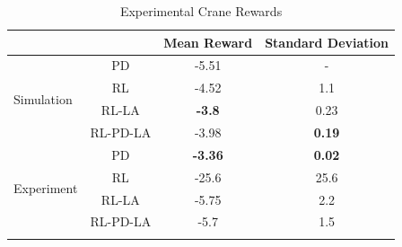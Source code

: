 \begin{table}[tb]
\begin{center}
  \setlength{\tabcolsep}{6pt}
  \caption{Experimental Crane Rewards}
  \begin{tabular}{ l c c c }
    \hline
              & & \textbf{Mean Reward} & \textbf{Standard Deviation}\\
   \hline
   \multirow{4}{*}{Simulation} & PD & -5.51 & -\\
              & RL & -4.52 & 1.1\\ 
              & RL-LA & \textbf{-3.8} & 0.23\\ 
              & RL-PD-LA & -3.98 & \textbf{0.19}\\ 
   \hline
   \multirow{4}{*}{Experiment} & PD & \textbf{-3.36} & \textbf{0.02}\\
              & RL & -25.6 & 25.6\\ 
              & RL-LA & -5.75 & 2.2 \\ 
              & RL-PD-LA & -5.7 & 1.5\\
   \hline
  \label{table:crane_experiment_reward}
  \end{tabular}
  \end{center}
\end{table}

